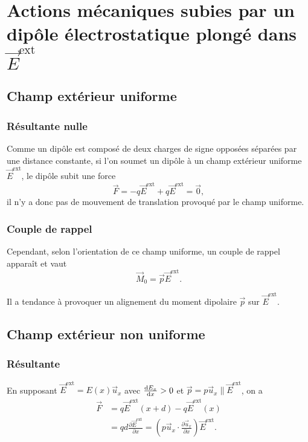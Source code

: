 \section[Actions mécaniques subies]{Actions mécaniques subies par un dipôle électrostatique plongé dans \texorpdfstring{$\vec{E}^{\text{ext}}$}{E}}

\subsection{Champ extérieur uniforme}
\subsubsection{Résultante nulle}

Comme un dipôle est composé de deux charges de signe opposées séparées par une distance constante, si l'on soumet un dipôle à un champ extérieur uniforme $\vec{E}^{\mathrm{ext}}$, le dipôle subit une force 
\begin{equation*}
    \vec{F}=-q\vec{E}^{\mathrm{ext}}+q\vec{E}^{\mathrm{ext}}=\vec{0},
\end{equation*}
il n'y a donc pas de mouvement de translation provoqué par le champ uniforme.

\subsubsection{Couple de rappel}

Cependant, selon l'orientation de ce champ uniforme, un couple de rappel apparaît et vaut
\begin{equation*}
    \boxed{
        \vec{M}_{0}=\vec{p}\vec{E}^{\mathrm{ext}}.
    }
\end{equation*}

Il a tendance à provoquer un alignement du moment dipolaire $\vec{p}$ sur $\vec{E}^{\mathrm{ext}}$.

\subsection{Champ extérieur non uniforme}
\subsubsection{Résultante}

En supposant $\vec{E}^{\mathrm{ext}}=E(x)\vec{u}_x$ avec $\frac{\mathrm{d} E_x}{\mathrm{d} x}>0$ et $\vec{p}=p\vec{u}_x\parallel\vec{E}^{\mathrm{ext}}$, on a 
\begin{align*}
    \vec{F}
    &=
    q\vec{E}^{\mathrm{ext}}(x+d)-q\vec{E}^{\mathrm{ext}}(x)\\
    &=
    qd\frac{\partial \vec{E}^{\mathrm{ext}}}{\partial x}
    = \left(
        p\vec{u}_x\cdot\frac{\partial \vec{u}_x}{\partial x}
    \right)\vec{E}^{\mathrm{ext}}.
\end{align*}

